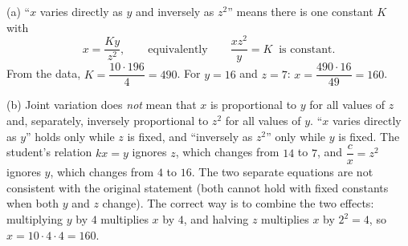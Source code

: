 (a) ``$x$ varies directly as $y$ and inversely as $z^2$'' means there is one constant $K$ with
\[
x=\dfrac{Ky}{z^2},\qquad\text{equivalently}\qquad \dfrac{xz^2}{y}=K\ \text{ is constant.}
\]
From the data, $K=\dfrac{10\cdot196}{4}=490$. For $y=16$ and $z=7$: $x=\dfrac{490\cdot16}{49}=\boxed{160}$.

(b) Joint variation does \emph{not} mean that $x$ is proportional to $y$ for all values of $z$ and, separately, inversely proportional to $z^2$ for all values of $y$. ``$x$ varies directly as $y$'' holds only while $z$ is fixed, and ``inversely as $z^2$'' only while $y$ is fixed. The student's relation $kx=y$ ignores $z$, which changes from $14$ to $7$, and $\dfrac {c}{x}=z^2$ ignores $y$, which changes from $4$ to $16$. The two separate equations are not consistent with the original statement (both cannot hold with fixed constants when both $y$ and $z$ change). The correct way is to combine the two effects: multiplying $y$ by $4$ multiplies $x$ by $4$, and halving $z$ multiplies $x$ by $2^2=4$, so $x=10\cdot4\cdot4=160$.
